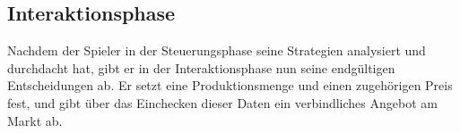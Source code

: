 \subsection{Interaktionsphase}
\label{sub:spielwelt-regeln-Interaktionsphase}

Nachdem der Spieler in der Steuerungsphase seine Strategien analysiert und durchdacht hat, gibt er in der Interaktionsphase nun seine endgültigen Entscheidungen ab. Er setzt eine Produktionsmenge und einen zugehörigen Preis fest, und gibt über das Einchecken dieser Daten ein verbindliches Angebot am Markt ab. 




